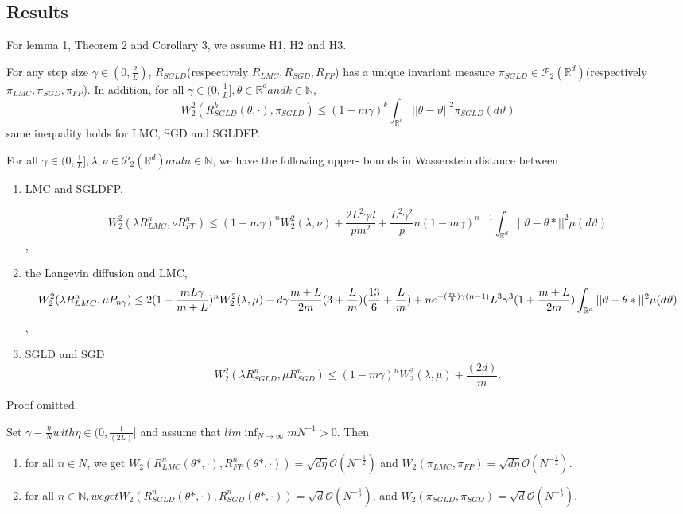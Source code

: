 \subsection{Results}
For lemma 1, Theorem 2 and Corollary 3, we assume H1, H2 and H3.
\begin{lemma}
For any step size $\gamma \in (0, \frac{2}{L})$, $R_{SGLD}$(respectively $R_{LMC}, R_{SGD}, R_{FP}$) has a unique invariant measure $\pi_{SGLD}\in \mathcal{P}_2(\mathbb{R}^d)$(respectively $\pi_{LMC}, \pi_{SGD}, \pi_{FP}$). In addition, for all $\gamma \in (0, \frac{1}{L}], \theta\in \mathbb{R}^d and k\in\mathbb{N}$,
$$W_2^2(R_{SGLD}^k(\theta, \cdot), \pi_{SGLD})\leq(1-m\gamma)^k\int_{\mathbb{R}^d}||\theta-\vartheta||^2\pi_{SGLD}(d\vartheta)$$
same inequality holds for LMC, SGD and SGLDFP.
\end{lemma}
\begin{theorem}
For all $\gamma\in(0,\frac{1}{L}], \lambda, \nu\in \mathcal{P}_2(\mathbb{R}^d) and n\in\mathbb{N}$, we have the following upper- bounds in Wasserstein distance between
\begin{enumerate}
	\item 
	LMC and SGLDFP,

\begin{dmath}	
W_2^2(\lambda R_{LMC}^n, \nu R_{FP}^n)\leq(1-m\gamma)^nW_2^2(\lambda, \nu) + \frac{2L^2\gamma d}{pm^2}+\frac{L^2\gamma^2}{p}n(1-m\gamma)^{n-1}\int_{\mathbb{R}^d}||\vartheta-\theta*||^2 \mu(d\vartheta)
\end{dmath},
	\item 
	the Langevin diffusion and LMC,
\begin{dmath}
W_2^2(\lambda R_{LMC}^n, \mu P_{n\gamma})\leq2(1-\frac{mL\gamma}{m+L})^nW_2^2(\lambda, \mu)+d\gamma\frac{m+L}{2m}(3+\frac{L}{m})(\frac{13}{6}+\frac{L}{m})\\+ne^{-(\frac{m}{2})\gamma(n-1)}L^3\gamma^3(1+\frac{m+L}{2m})\int_{\mathbb{R}^d}||\vartheta - \theta*||^2 \mu(d\vartheta)
\end{dmath},
	\item 
	SGLD and SGD
	\begin{dmath}
	W_2^2(\lambda R_{SGLD}^n, \mu R_{SGD}^n)\leq (1-m\gamma)^n W_2^2(\lambda, \mu)+\frac{(2d)}{m}.
	\end{dmath}
\end{enumerate}
\end{theorem}
Proof omitted.
\begin{cor}
Set $\gamma - \frac{\eta}{N} with \eta \in (0, \frac{1}{(2L)}]$ and assume that $lim \inf_{N \to \infty}mN^{-1}>0$. Then
\begin{enumerate}
\item
for all $n \in N$, we get $W_2(R_{LMC}^n(\theta*, \cdot), R_{FP}^{n}(\theta*, \cdot)) = \sqrt{d\eta}\mathcal{O}(N^{-\frac{1}{2}})$ and $W_2(\pi_{LMC}, \pi_{FP}) = \sqrt{d\eta}\mathcal{O}(N^{-\frac{1}{2}})$.
\item 
for all $n\in \mathbb{N}, we get W_2(R_{SGLD}^{n}(\theta*, \cdot), R^n_{SGD}(\theta*, \cdot)) = \sqrt{d}\mathcal{O}(N^{-\frac{1}{2}})$, and $W_2(\pi_{SGLD}, \pi_{SGD}) = \sqrt{d}\mathcal{O}(N^{-\frac{1}{2}})$.
\end{enumerate}
\end{cor}


